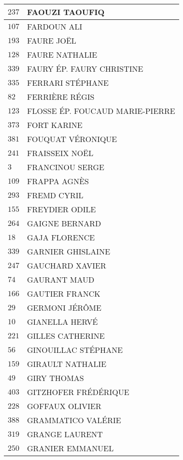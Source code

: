 \begin{xltabular}{\linewidth}{|l|X|}
    \hline
    $237$ & FAOUZI TAOUFIQ \\
    \hline
    $107$ & FARDOUN ALI \\
    \hline
    $193$ & FAURE JOËL \\
    \hline
    $128$ & FAURE NATHALIE \\
    \hline
    $339$ & FAURY ÉP. FAURY CHRISTINE \\
    \hline
    $335$ & FERRARI STÉPHANE \\
    \hline
    $82$ & FERRIÈRE RÉGIS \\
    \hline
    $123$ & FLOSSE ÉP. FOUCAUD MARIE-PIERRE \\
    \hline
    $373$ & FORT KARINE \\
    \hline
    $381$ & FOUQUAT VÉRONIQUE \\
    \hline
    $241$ & FRAISSEIX NOËL \\
    \hline
    $3$ & FRANCINOU SERGE \\
    \hline
    $109$ & FRAPPA AGNÈS \\
    \hline
    $293$ & FREMD CYRIL \\
    \hline
    $155$ & FREYDIER ODILE \\
    \hline
    $264$ & GAIGNE BERNARD \\
    \hline
    $18$ & GAJA FLORENCE \\
    \hline
    $339$ & GARNIER GHISLAINE \\
    \hline
    $247$ & GAUCHARD XAVIER \\
    \hline
    $74$ & GAURANT MAUD \\
    \hline
    $166$ & GAUTIER FRANCK \\
    \hline
    $29$ & GERMONI JÉRÔME \\
    \hline
    $10$ & GIANELLA HERVÉ \\
    \hline
    $221$ & GILLES CATHERINE \\
    \hline
    $56$ & GINOUILLAC STÉPHANE \\
    \hline
    $159$ & GIRAULT NATHALIE \\
    \hline
    $49$ & GIRY THOMAS \\
    \hline
    $403$ & GITZHOFER FRÉDÉRIQUE \\
    \hline
    $228$ & GOFFAUX OLIVIER \\
    \hline
    $388$ & GRAMMATICO VALÉRIE \\
    \hline
    $319$ & GRANGE LAURENT \\
    \hline
    $250$ & GRANIER EMMANUEL \\

\end{xltabular}
